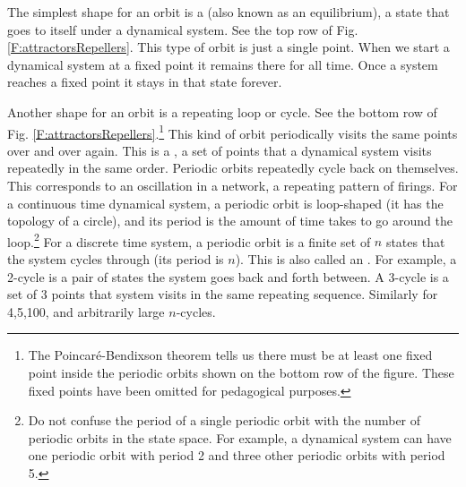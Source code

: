    The simplest shape for an orbit is a  (also known as an equilibrium), a state that goes to itself under a dynamical system. See the top row of Fig. \ref{F:attractorsRepellers}. This type of orbit is just a single point. When we start a dynamical system  at a fixed point it remains there for all time. Once a system reaches a
fixed point it stays in that state forever. 

Another shape for an orbit is a repeating loop or cycle. See the bottom row of Fig. \ref{F:attractorsRepellers}.\footnote{The Poincar\'{e}-Bendixson theorem tells us there must be at least one fixed point inside the periodic orbits shown on the bottom row of the figure. These fixed points have been omitted for pedagogical purposes.} This kind of orbit periodically visits the same points over and over again. This is a , a set of points that a dynamical system visits repeatedly in the same order. Periodic orbits repeatedly cycle back on themselves. This corresponds to an oscillation in a network, a repeating pattern of firings. For a continuous time dynamical system, a periodic orbit is loop-shaped (it has the topology of a circle), and its period is the amount of time takes to go around the loop.\footnote{Do not confuse the period of a single periodic  orbit with the number of periodic orbits in the state space. For example, a dynamical system can have one periodic orbit with period 2 and three other periodic orbits with period 5.}
  For a discrete time system, a periodic orbit is a finite set of $n$ states that the system cycles through (its period is $n$). This is also called an . For example, a 2-cycle is a pair of states the system goes back and forth between. A 3-cycle is a set of 3 points that system visits in the same repeating sequence. Similarly for 4,5,100, and arbitrarily large $n$-cycles.


